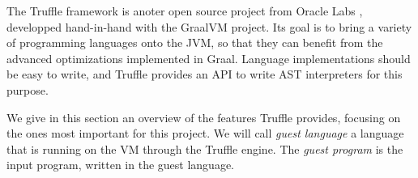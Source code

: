 \documentclass[twoside,11pt,a4paper]{article}
\begin{document}

The Truffle framework is anoter open source project from Oracle Labs \cite{trufflerepo}, developped hand-in-hand with the GraalVM project. Its goal is to bring a variety of programming languages onto the JVM, so that they can benefit from the advanced optimizations implemented in Graal. Language implementations should be easy to write, and Truffle provides an API to write AST interpreters for this purpose.

We give in this section an overview of the features Truffle provides, focusing on the ones most important for this project. We will call \textit{guest language} a language that is running on the VM through the Truffle engine. The \textit{guest program} is the input program, written in the guest language.





\end{document}
